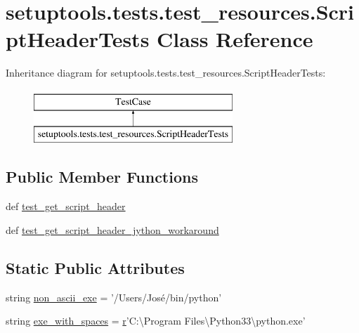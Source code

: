 \hypertarget{classsetuptools_1_1tests_1_1test__resources_1_1ScriptHeaderTests}{}\section{setuptools.\+tests.\+test\+\_\+resources.\+Script\+Header\+Tests Class Reference}
\label{classsetuptools_1_1tests_1_1test__resources_1_1ScriptHeaderTests}
Inheritance diagram for setuptools.\+tests.\+test\+\_\+resources.\+Script\+Header\+Tests\+:\begin{figure}[H]
\begin{center}
\leavevmode
\includegraphics[height=2.000000cm]{classsetuptools_1_1tests_1_1test__resources_1_1ScriptHeaderTests}
\end{center}
\end{figure}
\subsection*{Public Member Functions}
\begin{DoxyCompactItemize}
\item 
def \hyperlink{classsetuptools_1_1tests_1_1test__resources_1_1ScriptHeaderTests_a00fa5175898f19a03f8e2c10925b89c8}{test\+\_\+get\+\_\+script\+\_\+header}
\item 
def \hyperlink{classsetuptools_1_1tests_1_1test__resources_1_1ScriptHeaderTests_af842c4b11c8324cb5583416517c1181b}{test\+\_\+get\+\_\+script\+\_\+header\+\_\+jython\+\_\+workaround}
\end{DoxyCompactItemize}
\subsection*{Static Public Attributes}
\begin{DoxyCompactItemize}
\item 
string \hyperlink{classsetuptools_1_1tests_1_1test__resources_1_1ScriptHeaderTests_ae320b7b55e428070d710f48a4db0ae01}{non\+\_\+ascii\+\_\+exe} = '/Users/José/bin/python'
\item 
string \hyperlink{classsetuptools_1_1tests_1_1test__resources_1_1ScriptHeaderTests_af12086cb9bcdff2fd9d002c5fb443a5a}{exe\+\_\+with\+\_\+spaces} = \hyperlink{indexexpr_8h_ac434fd11cc2493608d8d91424d60c17e}{r}'C\+:\textbackslash{}\+Program Files\textbackslash{}\+Python33\textbackslash{}python.\+exe'
\end{DoxyCompactItemize}


